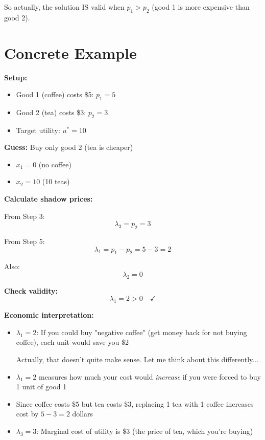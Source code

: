 \documentclass[11pt]{article}
\begin{document}
So actually, the solution IS valid when $p_1 > p_2$ (good 1 is more expensive than good 2).

\section{Concrete Example}

\textbf{Setup:}
\begin{itemize}
\item Good 1 (coffee) costs \$5: $p_1 = 5$
\item Good 2 (tea) costs \$3: $p_2 = 3$
\item Target utility: $u^* = 10$
\end{itemize}

\textbf{Guess:} Buy only good 2 (tea is cheaper)
\begin{itemize}
\item $x_1 = 0$ (no coffee)
\item $x_2 = 10$ (10 teas)
\end{itemize}

\textbf{Calculate shadow prices:}

From Step 3:
\begin{equation}
\lambda_3 = p_2 = 3
\end{equation}

From Step 5:
\begin{equation}
\lambda_1 = p_1 - p_2 = 5 - 3 = 2
\end{equation}

Also:
\begin{equation}
\lambda_2 = 0
\end{equation}

\textbf{Check validity:}
\begin{equation}
\lambda_1 = 2 > 0 \quad \checkmark
\end{equation}

\textbf{Economic interpretation:}
\begin{itemize}
\item $\lambda_1 = 2$: If you could buy "negative coffee" (get money back for not buying coffee), each unit would save you \$2

Actually, that doesn't quite make sense. Let me think about this differently...

\item $\lambda_1 = 2$ measures how much your cost would \textit{increase} if you were forced to buy 1 unit of good 1

\item Since coffee costs \$5 but tea costs \$3, replacing 1 tea with 1 coffee increases cost by $5 - 3 = 2$ dollars

\item $\lambda_3 = 3$: Marginal cost of utility is \$3 (the price of tea, which you're buying)
\end{itemize}
\end{document}
